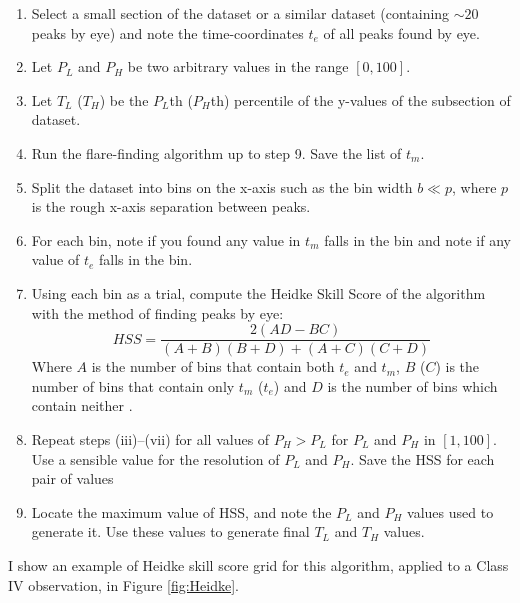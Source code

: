 \begin{enumerate}
  \item Select a small section of the dataset or a similar dataset (containing $\sim20$ peaks by eye) and note the time-coordinates $t_e$ of all peaks found by eye.
  \item Let $P_L$ and $P_H$ be two arbitrary values in the range $[0,100]$.
  \item Let $T_L$ ($T_H$) be the $P_L$th ($P_H$th) percentile of the y-values of the subsection of dataset.
  \item Run the flare-finding algorithm up to step 9.  Save the list of $t_m$.
  \item Split the dataset into bins on the x-axis such as the bin width $b\ll p$, where $p$ is the rough x-axis separation between peaks.
  \item For each bin, note if you found any value in $t_m$ falls in the bin and note if any value of $t_e$ falls in the bin.
  \item Using each bin as a trial, compute the Heidke Skill Score \citep{Heidke_SKSC} of the algorithm with the method of finding peaks by eye:
  \begin{equation}HSS = \frac{2(AD-BC)}{(A+B)(B+D)+(A+C)(C+D)}
  \label{eq:HSS}
  \end{equation}
  Where $A$ is the number of bins that contain both $t_e$ and $t_m$, $B$ ($C$) is the number of bins that contain only $t_m$ ($t_e$) and $D$ is the number of bins which contain neither \citep{Kok_YesNo}.
  \item Repeat steps (iii)--(vii) for all values of $P_H>P_L$ for $P_L$ and $P_H$ in $[1,100]$.  Use a sensible value for the resolution of $P_L$ and $P_H$.  Save the HSS for each pair of values
  \item Locate the maximum value of HSS, and note the $P_L$ and $P_H$ values used to generate it.  Use these values to generate final $T_L$ and $T_H$ values.
\end{enumerate}

I show an example of Heidke skill score grid for this algorithm, applied to a Class IV observation, in Figure \ref{fig:Heidke}.

